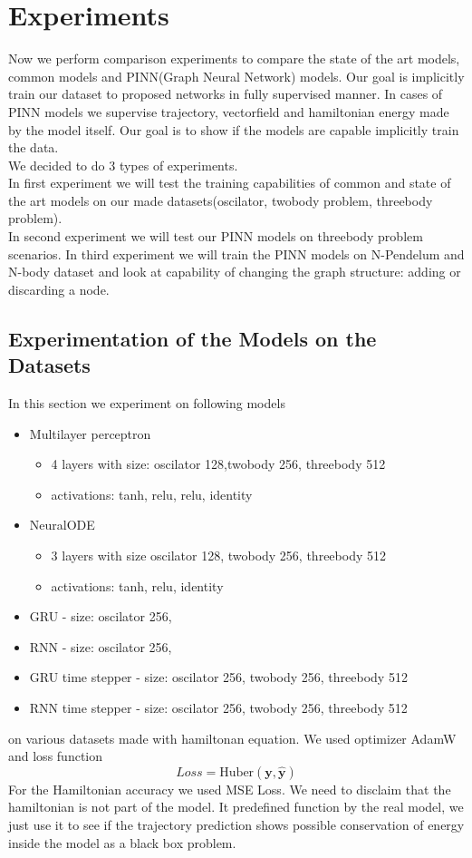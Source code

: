 \chapter{Experiments}
Now we perform comparison experiments to compare the state of the art models, common models and PINN(Graph Neural Network) models. Our goal is implicitly train our dataset to proposed networks in fully supervised manner. In cases of PINN models we supervise trajectory, vectorfield and hamiltonian energy made by the model itself. Our goal is to show if the models are capable implicitly train the data.\\
We decided to do 3 types of experiments.\\
In first experiment we will test the training capabilities of common and state of the art models on our made datasets(oscilator, twobody problem, threebody problem).\\
In second experiment  we will test our PINN models on threebody problem scenarios.
In third experiment we will train the PINN models on N-Pendelum and N-body dataset and look at capability of changing the graph structure: adding or discarding a node. 

\section{Experimentation of the Models on the Datasets}
In this section we experiment on following models
\begin{itemize}
	\item Multilayer perceptron
	\begin{itemize}
		\item 4 layers with size: oscilator 128,twobody 256, threebody 512
		\item activations: tanh, relu, relu, identity
	\end{itemize}
	
	\item NeuralODE
	\begin{itemize}
		\item 3 layers with size oscilator 128, twobody 256, threebody 512
		\item activations: tanh, relu, identity
	\end{itemize}
	
	\item GRU - size: oscilator 256,
	\item RNN - size: oscilator 256,
	\item GRU time stepper - size: oscilator 256, twobody 256, threebody 512
	\item RNN time stepper - size: oscilator 256, twobody 256, threebody 512
\end{itemize}
on various datasets made with hamiltonan equation.
We used optimizer AdamW and loss function
\begin{equation}
	Loss = \text{Huber}(\mathbf{y},\hat{\mathbf{y}})
\end{equation}
For the Hamiltonian accuracy we used MSE Loss. We need to disclaim that the hamiltonian is not part of the model. It predefined function by the real model, we just use it to see if the trajectory prediction shows possible conservation of energy inside the model as a black box problem. 
